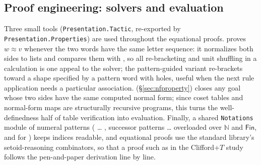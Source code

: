 \subsection{Proof engineering: solvers and evaluation}\label{sec:solvers}

Three small tools (\texttt{Presentation.Tactic}, re-exported by
\texttt{Presentation.Properties}) are used throughout the equational
proofs.
 proves $w \approx v$ whenever the two words have the same
letter sequence: it normalizes both sides to lists and compares them
with , so all re-bracketing and unit shuffling in a
calculation is one appeal to the solver; the pattern-guided variant
 re-brackets toward a shape specified by a pattern word
with holes, useful when the next rule application needs a
particular association.   (\S\ref{sec:nfproperty})
closes any goal whose two sides have the same computed normal form; since
coset tables and normal-form maps are structurally recursive programs,
this turns the well-definedness half of table verification into
evaluation.  Finally, a shared \texttt{Notations}
module of numeral patterns
( … , successor patterns  …  overloaded
over $\mathbb{N}$ and $\mathsf{Fin}$, and  for )
keeps indices readable, and equational proofs use the standard
library's setoid-reasoning combinators, so that a proof such as
 in the Clifford+$T$ study follows the pen-and-paper
derivation line by line.
